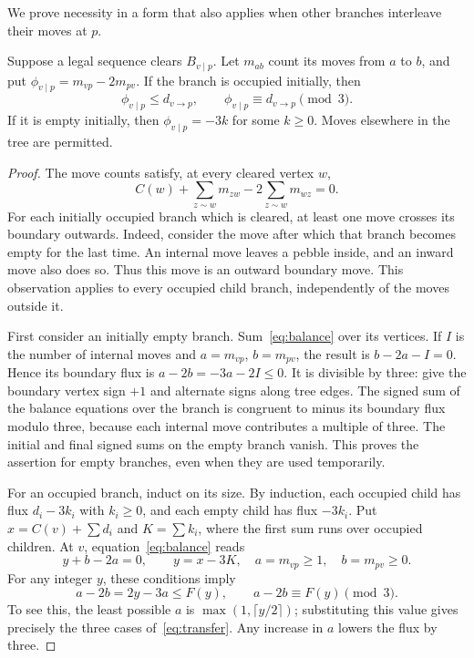 We prove necessity in a form that also applies when other branches
interleave their moves at $p$.
\begin{lemma}\label{lem:flux}
Suppose a legal sequence clears $B_{v\mid p}$. Let $m_{a b}$ count its
moves from $a$ to $b$, and put
$\phi_{v\mid p}=m_{v p}-2m_{p v}$.
If the branch is occupied initially, then
\[
 \phi_{v\mid p}\le d_{v\to p},\qquad
 \phi_{v\mid p}\equiv d_{v\to p}\pmod3.
\]
If it is empty initially, then $\phi_{v\mid p}=-3k$ for some $k\ge0$.
Moves elsewhere in the tree are permitted.
\end{lemma}
\begin{proof}
The move counts satisfy, at every cleared vertex $w$,
\begin{equation}\label{eq:balance}
 C(w)+\sum_{z\sim w}m_{z w}-2\sum_{z\sim w}m_{w z}=0.
\end{equation}
For each initially occupied branch which is cleared, at least one move
crosses its boundary outwards. Indeed, consider the move after which that
branch becomes empty for the last time. An internal move leaves a pebble
inside, and an inward move also does so. Thus this move is an outward
boundary move. This observation applies to every occupied child branch,
independently of the moves outside it.

First consider an initially empty branch. Sum~\eqref{eq:balance} over
its vertices. If $I$ is the number of internal moves and
$a=m_{v p}$, $b=m_{p v}$, the result is $b-2a-I=0$.
Hence its boundary flux is
$a-2b=-3a-2I\le0$. It is divisible by three: give the boundary vertex
sign $+1$ and alternate signs along tree edges. The signed sum of the
balance equations over the branch is congruent to minus its boundary
flux modulo three, because each internal move contributes a multiple of
three. The initial and final signed sums on the empty branch vanish.
This proves the assertion for empty branches, even when they are used
temporarily.

For an occupied branch, induct on its size. By induction, each occupied
child has flux $d_i-3k_i$ with $k_i\ge0$, and each empty child has flux
$-3k_i$. Put $x=C(v)+\sum d_i$ and $K=\sum k_i$, where the first sum
runs over occupied children. At $v$, equation~\eqref{eq:balance} reads
\[
 y+b-2a=0,\qquad y=x-3K,\quad a=m_{v p}\ge1,\quad b=m_{p v}\ge0.
\]
For any integer $y$, these conditions imply
\begin{equation}\label{eq:one-vertex-flux}
 a-2b=2y-3a\le F(y),\qquad a-2b\equiv F(y)\pmod3.
\end{equation}
To see this, the least possible $a$ is
$\max(1,\lceil y/2\rceil)$; substituting this value gives precisely
the three cases of~\eqref{eq:transfer}. Any increase in $a$ lowers
the flux by three.


\end{proof}
